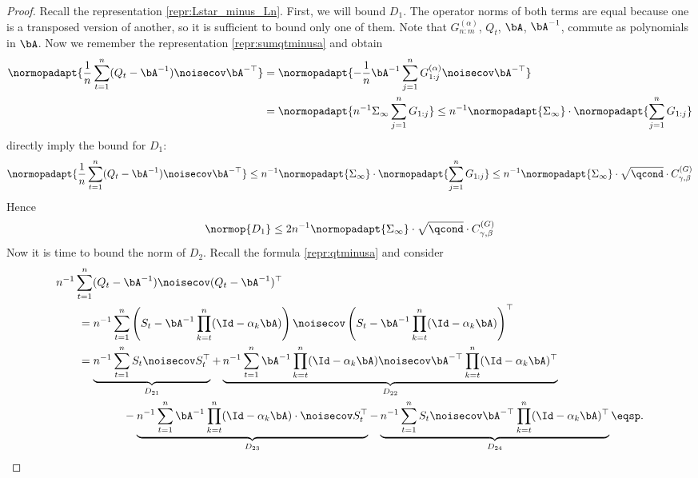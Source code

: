 \begin{proof}
    Recall the representation \eqref{repr:Lstar_minus_Ln}. First, we will bound $D_1$. The operator norms of both terms are equal because one is a transposed version of another, so it is sufficient to bound only one of them. Note that $G_{n:m}^{(\alpha)}$, $Q_t$, $\bA$, $\bA^{-1}$, commute as polynomials in $\bA$. Now we remember the representation \eqref{repr:sumqtminusa} and obtain
    \begin{align}
        \normopadapt{\frac{1}{n}\sum_{t=1}^n (Q_t - \bA^{-1})\noisecov \bA^{-\top}} &= \normopadapt{-\frac{1}{n} \bA^{-1} \sum_{j=1}^n G_{1:j}^{(\alpha)}\noisecov \bA^{-\top}} \\ &= \normopadapt{n^{-1} \Sigma_{\infty}  \sum_{j=1}^n G_{1:j}} \leq n^{-1} \normopadapt{\Sigma_{\infty}} \cdot \normopadapt{\sum_{j=1}^n G_{1:j}}
    \end{align}
    {} directly imply the bound for $D_1$:
    \begin{align}
        \normopadapt{\frac{1}{n}\sum_{t=1}^n (Q_t - \bA^{-1})\noisecov \bA^{-\top}} \leq n^{-1} \normopadapt{\Sigma_{\infty}} \cdot \normopadapt{\sum_{j=1}^n G_{1:j}} \leq n^{-1} \normopadapt{\Sigma_{\infty}} \cdot \sqrt{\qcond} \cdot C_{\gamma, \beta}^{(G)}
    \end{align}
    Hence
    \begin{align}
        \label{lemma:D1_bound}
        \normop{D_1} \leq 2 n^{-1}\normopadapt{\Sigma_{\infty}} \cdot \sqrt{\qcond} \cdot C_{\gamma, \beta}^{(G)}
    \end{align}
    Now it is time to bound the norm of $D_2$. Recall the formula \eqref{repr:qtminusa} and consider
    \begin{align}
        \label{lemma:D2_expanded_repr}
        &n^{-1}\sum_{t=1}^n(Q_t - \bA^{-1}) \noisecov (Q_t - \bA^{-1})^\top \\
        &\qquad = n^{-1}\sum_{t=1}^n\left(S_t - \bA^{-1} \prod_{k=t}^n (\Id - \alpha_k \bA)\right) \noisecov \left(S_t - \bA^{-1} \prod_{k=t}^n (\Id - \alpha_k \bA)\right)^\top \\
        &\qquad = \underbrace{n^{-1} \sum_{t=1}^n S_t \noisecov S_t^\top}_{D_{21}} + \underbrace{n^{-1}\sum_{t=1}^n\bA^{-1} \prod_{k=t}^n (\Id - \alpha_k \bA) \noisecov \bA^{-\top} \prod_{k=t}^n (\Id - \alpha_k \bA)^\top}_{D_{22}} \\ 
        &\qquad\qquad \qquad  -\underbrace{n^{-1} \sum_{t=1}^n \bA^{-1} \prod_{k=t}^n (\Id - \alpha_k \bA) \cdot \noisecov S_t^\top}_{D_{23}} - \underbrace{n^{-1}\sum_{t=1}^n S_t \noisecov \bA^{-\top} \prod_{k=t}^n (\Id - \alpha_k \bA)^{\top}}_{D_{24}}\eqsp.

\end{align}
\end{proof}
